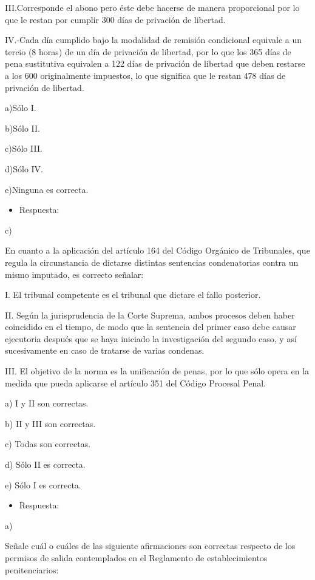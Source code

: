 \documentclass[letterpaper, 11pt]{article}
\begin{document}
III.Corresponde el abono pero éste debe hacerse de manera proporcional por lo que
le restan por cumplir 300 días de privación de libertad.

IV.-Cada día cumplido bajo la modalidad de remisión condicional equivale a un tercio
(8 horas) de un día de privación de libertad, por lo que los 365 días de pena
sustitutiva equivalen a 122 días de privación de libertad que deben restarse a los
600 originalmente impuestos, lo que significa que le restan 478 días de privación
de libertad.

a)Sólo I.

b)Sólo II.

c)Sólo III.

d)Sólo IV.

e)Ninguna es correcta.

\begin{itemize}
\item Respuesta:
\end{itemize}
c)



En cuanto a la aplicación del artículo 164 del Código Orgánico de Tribunales, que
regula la circunstancia de dictarse distintas sentencias condenatorias contra un
mismo imputado, es correcto señalar:

I. El tribunal competente es el tribunal que dictare el fallo posterior.

II. Según la jurisprudencia de la Corte Suprema, ambos procesos deben haber
coincidido en el tiempo, de modo que la sentencia del primer caso debe causar
ejecutoria después que se haya iniciado la investigación del segundo caso, y así
sucesivamente en caso de tratarse de varias condenas.

III. El objetivo de la norma es la unificación de penas, por lo que sólo opera en la
medida que pueda aplicarse el artículo 351 del Código Procesal Penal.

a) I y II son correctas.

b) II y III son correctas.

c) Todas son correctas.

d) Sólo II es correcta.

e) Sólo I es correcta.

\begin{itemize}
\item Respuesta:
\end{itemize}
a)

Señale cuál o cuáles de las siguiente afirmaciones son correctas respecto de los
permisos de salida contemplados en el Reglamento de establecimientos
penitenciarios:
\end{document}
